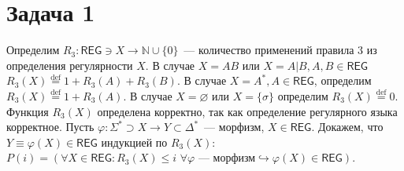 \documentclass[a4paper]{article}
\def\REG{{\mathsf{REG}}}
\begin{document}
\section*{Задача 1}
Определим $R_3:\REG\ni X\longrightarrow \mathbb{N}\cup\{0\}$~--- количество применений правила $3$ из определения регулярности $X$. В случае $X=AB$ или $X=A|B, A,B\in\REG$ $R_3(X)\overset{\mathrm{def}}{=}1+R_3(A)+R_3(B)$. В случае $X=A^*, A\in\REG$, определим $R_3(X)\overset{\mathrm{def}}{=}1+R_3(A)$. В случае $X=\varnothing$ или $X=\{\sigma\}$ определим $R_3(X)\overset{\mathrm{def}}{=}0$. Функция $R_3(X)$ определена корректно, так как определение регулярного языка корректное.\newline
Пусть $\varphi\colon\Sigma^*\supset X\longrightarrow Y\subset\Delta^*$~--- морфизм, $X\in\REG$. Докажем, что $Y\equiv\varphi(X)\in\REG$ индукцией по $R_3(X)$:
\\[5pt]
$P(i)=(\forall X\in\REG\colon R_3(X)\leqslant i\,\,\forall\varphi\mbox{~--- морфизм}\hookrightarrow \varphi(X)\in\REG)$.
\\[1pt]
\end{document}

